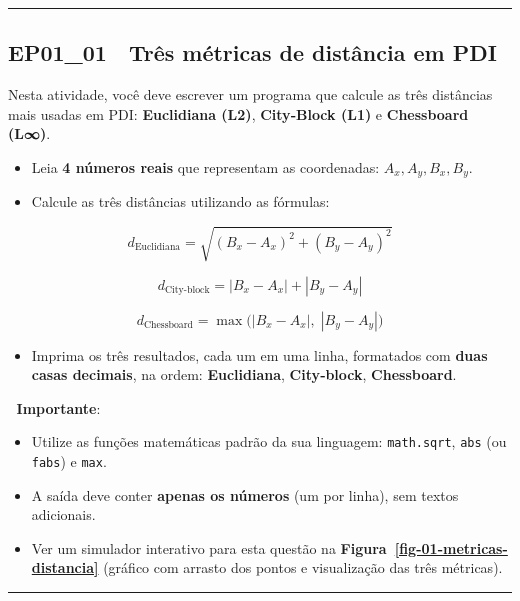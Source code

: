\documentclass[
  portuguese,
  letterpaper,
  openany,
  oneside,
  12pt,
  a4paper]{book}
\providecommand{\tightlist}{%
  \setlength{\itemsep}{0pt}\setlength{\parskip}{0pt}}
\begin{document}
\begin{center}\rule{0.5\linewidth}{0.5pt}\end{center}

\subsection{EP01\_01 📏 Três métricas de distância em
PDI}\label{ep01_01-truxeas-muxe9tricas-de-distuxe2ncia-em-pdi}

Nesta atividade, você deve escrever um programa que calcule as três
distâncias mais usadas em PDI: \textbf{Euclidiana (L2)},
\textbf{City‑Block (L1)} e \textbf{Chessboard (L∞)}.

\begin{itemize}
\tightlist
\item
  Leia \textbf{4 números reais} que representam as coordenadas:
  \(A_x, A_y, B_x, B_y\).
\item
  Calcule as três distâncias utilizando as fórmulas:
\end{itemize}

\[d_{\text{Euclidiana}} = \sqrt{(B_x - A_x)^2 + (B_y - A_y)^2}\]

\[d_{\text{City-block}} = |B_x - A_x| + |B_y - A_y|\]

\[d_{\text{Chessboard}} = \max\big(|B_x - A_x|,\; |B_y - A_y|\big)\]

\begin{itemize}
\tightlist
\item
  Imprima os três resultados, cada um em uma linha, formatados com
  \textbf{duas casas decimais}, na ordem: \textbf{Euclidiana},
  \textbf{City‑block}, \textbf{Chessboard}.
\end{itemize}

📌 \textbf{Importante}:

\begin{itemize}
\tightlist
\item
  Utilize as funções matemáticas padrão da sua linguagem:
  \texttt{math.sqrt}, \texttt{abs} (ou \texttt{fabs}) e \texttt{max}.
\item
  A saída deve conter \textbf{apenas os números} (um por linha), sem
  textos adicionais.
\item
  Ver um simulador interativo para esta questão na
  \textbf{Figura~\ref{fig-01-metricas-distancia}} (gráfico com arrasto
  dos pontos e visualização das três métricas).
\end{itemize}

\begin{center}\rule{0.5\linewidth}{0.5pt}\end{center}
\end{document}
